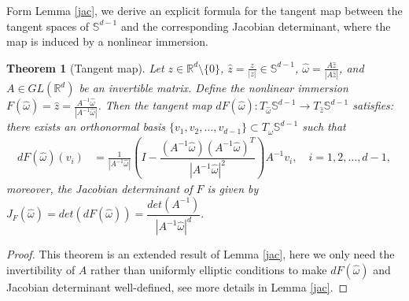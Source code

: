 \documentclass[11pt,reqno]{amsart}
\newtheorem{theorem}{\indent Theorem}[section]
\numberwithin{equation}{section}
\newcommand{\s}{\mathbb{S}}
\newcommand{\om}{\omega}
\newcommand{\mb}{\mathbb}
\begin{document}
Form Lemma \ref{jac}, we derive an explicit formula for the tangent map between the tangent spaces of $ \s^{d-1}$ and the corresponding Jacobian determinant,  where the map is induced by a nonlinear immersion.
\begin{theorem}[Tangent map]\label{tan}
	Let $z\in\mb{R}^{d}\setminus\{0\}$,  $\hat{z}=\frac{z}{|z|}\in\mb{S}^{d-1}$, $\hat{\om}=\frac{A\hat{z}}{|A\hat{z}|}$, and $A\in GL(\mathbb{R}^{d})$ be an invertible matrix. Define the nonlinear immersion $F(\hat{\om})=\hat{z}=\frac{A^{-1} \hat{\om}}{|A^{-1} \hat{\om}|}$. Then the tangent map $dF(\hat{\om}):T_{\hat{\om}}\s^{d-1}\rightarrow T_{\hat{z}}\s^{d-1}$ satisfies: there exists an orthonormal basis $\{v_{1},v_{2},\dots,v_{d-1}\}\subset T_{\hat{\om}}\s^{d-1}$ such that 
	\begin{align*}
		dF(\hat{\om})(v_i)
		&=\frac{1}{|A^{-1}\hat{\om}|}\left(I-\dfrac{(A^{-1}\hat{\om})(A^{-1}\hat{\om})^T}{|A^{-1}\hat{\om}|^{2}} \right)A^{-1}v_i, \quad i=1,2,\dots,d-1,
	\end{align*}
	moreover, the Jacobian determinant of $F$ is given by $J_{F}(\hat{\om})=det(dF(\hat{\om}))=\dfrac{det(A^{-1})}{|A^{-1}\hat{\om}|^{d}}.$
\end{theorem}
\begin{proof}
	This theorem is an extended result of Lemma \ref{jac}, here we only need the invertibility of $A$ rather than uniformly elliptic conditions to make $dF(\hat{\om})$ and Jacobian determinant well-defined, see more details in Lemma \ref{jac}.
\end{proof}
\end{document}
